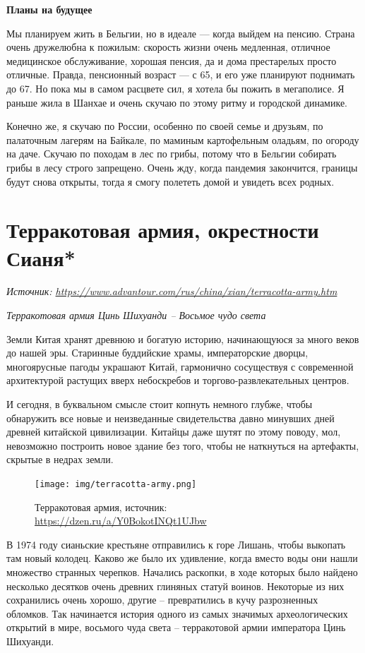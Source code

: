 \textbf{Планы на будущее}

Мы планируем жить в Бельгии, но в идеале — когда выйдем на пенсию. Страна очень дружелюбна к пожилым: скорость жизни очень медленная, отличное медицинское обслуживание, хорошая пенсия, да и дома престарелых просто отличные. Правда, пенсионный возраст — с 65, и его уже планируют поднимать до 67. Но пока мы в самом расцвете сил, я хотела бы пожить в мегаполисе. Я раньше жила в Шанхае и очень скучаю по этому ритму и городской динамике.

Конечно же, я скучаю по России, особенно по своей семье и друзьям, по палаточным лагерям на Байкале, по маминым картофельным оладьям, по огороду на даче. Скучаю по походам в лес по грибы, потому что в Бельгии собирать грибы в лесу строго запрещено. Очень жду, когда пандемия закончится, границы будут снова открыты, тогда я смогу полететь домой и увидеть всех родных.

\clearpage

\section{Терракотовая армия, окрестности Сианя*}

\textit{Источник: \url{https://www.advantour.com/rus/china/xian/terracotta-army.htm}}

\textit{Терракотовая армия Цинь Шихуанди – Восьмое чудо света}

Земли Китая хранят древнюю и богатую историю, начинающуюся за много веков до нашей эры. Старинные буддийские храмы, императорские дворцы, многоярусные пагоды украшают Китай, гармонично сосуществуя с современной архитектурой растущих вверх небоскребов и торгово-развлекательных центров.

И сегодня, в буквальном смысле стоит копнуть немного глубже, чтобы обнаружить все новые и неизведанные свидетельства давно минувших дней древней китайской цивилизации. Китайцы даже шутят по этому поводу, мол, невозможно построить новое здание без того, чтобы не наткнуться на артефакты, скрытые в недрах земли.


\begin{figure}
    \begin{center}
        \texttt{[image: img/terracotta-army.png]}
    \end{center}
    \caption{Терракотовая армия, источник: \url{https://dzen.ru/a/Y0BokotINQt1UJbw}}
\end{figure}
В 1974 году сианьские крестьяне отправились к горе Лишань, чтобы выкопать там новый колодец. Каково же было их удивление, когда вместо воды они нашли множество странных черепков. Начались раскопки, в ходе которых было найдено несколько десятков очень древних глиняных статуй воинов. Некоторые из них сохранились очень хорошо, другие – превратились в кучу разрозненных обломков. Так начинается история одного из самых значимых археологических открытий в мире, восьмого чуда света – терракотовой армии императора Цинь Шихуанди.

